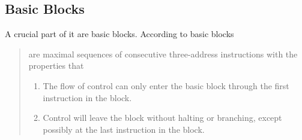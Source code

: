 \subsection{Basic Blocks}\label{subsec:basicBlock}
A crucial part of it are basic blocks.
According to \cite[chapter 8.4, p.~525]{Drachenbuch} basic blocks

\begin{quotation}\noindent
    \grqq[...] are maximal sequences of consecutive three-address instructions with the properties that
    \begin{enumerate}[label=(\alph*)]
        \item The flow of control can only enter the basic block through the first instruction in the block.
        \item Control will leave the block without halting or branching, except possibly at the last instruction in the block.\grqq
    \end{enumerate}
\end{quotation}
